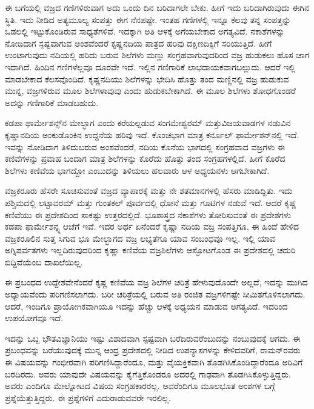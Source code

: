 \newpage

ಈ ಬಗೆಯಲ್ಲಿ ವಜ್ರದ ಗಣಿಗಳಿರುವಾಗ ಅದು ಒಂದು ದಿನ ಬರಿದಾಗಲೇ ಬೇಕು. ಹೀಗೆ ಇದು ಬರಿದಾಗಿರುವುದು ಈಗಿನ ಸ್ಥಿತಿ. ಇದು ನೀಡಿದ ಅತ್ಯಮೂಲ್ಯ ಸಂಪತ್ತು ಈಗ ನೆನಪಷ್ಟೇ. ಇಂತಹ ಗಣಿಗಳಲ್ಲಿ ಇನ್ನೂ ಕೆಲವು ತನ್ನ ಸಂಪತ್ತನ್ನು ಒಡಲಲ್ಲಿ ಇಟ್ಟುಕೊಂಡಿರುವ ಸಾಧ್ಯತೆಗಳಿವೆ. ಇದಕ್ಕಾಗಿ ಅತಿ ಆಳಕ್ಕೆ ಅಗೆಯಬೇಕಾದ ಅಗತ್ಯವಿದೆ. ನಕಾಶೆಗಳನ್ನು ನೋಡಿದಾಗ ಸ್ಪಷ್ಟವಾಗುವ ಅಂಶವೆಂದರೆ ಕೃಷ್ಣನದಿಯ ಪಾತ್ರದ ಹರಿವು ದಕ್ಷಿಣದಿಕ್ಕಿಗೆ ಸರಿಯುತ್ತಿದೆ. ಹೀಗೆ ಉಂಟಾಗುವುದು ನದಿಯಲ್ಲಿ ಹರಿದು ಬರುವ ಶಿಲೆಗಳು ಮಣ್ಣು ಸಂಗ್ರಹವಾಗುವುದರಿಂದ ವಜ್ರ ಹುಡುಕಲು ಹೊಸ ಜಾಗ ಇದಾಗಿದೆ. ಹಿಂದಿನ ಗಣಿಗಳೆಲ್ಲವೂ ದೂರವೇ ಇದೆ. ಇಲ್ಲಿನ ಗಣಿಗಾರಿಕೆ ಲಾಭದಾಯಕವಾಗಬಲ್ಲುದು. ಆದರೆ ಇಲ್ಲಿ ಮಾಡಬೇಕಾದ ಕೆಲಸವೊಂದಿದೆ. ಕೃಷ್ಣನದಿಯು ಶಿಲೆಗಳನ್ನು ಭೇದಿಸಿ ಹೊತ್ತು ತಂದ ಮಣ್ಣಿನಲ್ಲಿ ವಜ್ರ ಹುಡುಕುವ ಮುನ್ನ, ವಜ್ರಗಳಿರುವ ಮೂಲ ಶಿಲೆಗಳಾವುವು ಎಂದು ಹುಡುಕಬೇಕಾಗಿದೆ. ಈ ಮೂಲ ಶಿಲೆಗಳು ಶೋಧಗೊಂಡರೆ ಅದನ್ನು ಗಣಿಗಾರಿಕೆ ಮಾಡಬಹುದು. 

ಕಡಪಾ ಫಾರ್ಮೇಶನ್ಸ್‌ನ ಮೇಲ್ಭಾಗ ಎಂದು ಕರೆಯಲ್ಪಡುವ ಸಂಗಮೇಶ್ವರಮ್ ಮತ್ತು\break ವಿಜಯವಾಡಗಳ ನಡುವಿನ ಕೃಷ್ಣಾನದಿಯ ಅಂಕುಡೊಂಕಿನ ಉದ್ದನೆಯ ಹರಿವು ಇದೆ. ಕೊಂಚಭಾಗ ಮಾತ್ರ ಕರ್ನೂಲ್ ಫಾರ್ಮೇಶನ್‌ನಲ್ಲಿ ಇದೆ. ಇವನ್ನು ನೋಡಿದಾಗ ತಿಳಿದುಬರುವ ಅಂಶವೆಂದರೆ, ನದಿಯ ಕೊನೆಯ ಭಾಗದಲ್ಲಿ ಸಂಗ್ರಹವಾದ ವಜ್ರಗಳು ಈ ಕಣಿವೆಗಳನ್ನು ಪ್ರವಾಹ ಬಂದಾಗ ಮಾತ್ರ ಶಿಲೆಗಳನ್ನು ಕೊರೆದು ಹೊತ್ತು ತಂದ ಸಂಗ್ರಹಗಳಲ್ಲಿದೆ. ಹೀಗೆ ಕೊರೆದ ಶಿಲೆಗಳು ಕಣಿವೆಯ ಭಾಗದ್ದೋ ಎಂಬುದನ್ನು ತಿಳಿಯಲು ಹಲವಾರು ಆಳ ಅಧ್ಯಯನಳು ಆಗಬೇಕಾಗಿದೆ.

ವಜ್ರಕರೂರು ಹೆಸರೇ ಸೂಚಿಸುವಂತೆ ವಜ್ರದ ವ್ಯಾಪಾರಕ್ಕೆ  ಮತ್ತು  ನೇ ಶತಮಾನಗಳಲ್ಲಿ ಹೆಸರು ಮಾಡಿದ್ದಿತು. ಇದು ಪಶ್ಚಿಮದಲ್ಲಿ ಲಟ್ಟಾವರಮ್ ಮತ್ತು ಗುಂತಕಲ್ ಪೂರ್ವದಲ್ಲಿ ಧೋನೆ ಮತ್ತು ಗೂಟಿಗಳ ನಡುವೆ ಇದೆ. ಆದರೆ ಕೃಷ್ಣ ಕಣಿವೆಯು ಈ ಪ್ರದೇಶದಿಂದ ಸಾಕಷ್ಟು ಉತ್ತರದಲ್ಲಿದೆ. ಭೂಶಾಸ್ತ್ರದ ನಕಾಶೆಗಳು ತೋರಿಸುವಂತೆ ಈ ಪ್ರದೇಶಗಳು ಕಡಪಾ ಫಾರ್ಮೇಶನ್ಸ್ನ ಆಚೆಗೆ ಇವೆ. ಇದರ ಅರ್ಥ ಏನೆಂದರೆ ಕೃಷ್ಣಾ ನದಿಯ ವಜ್ರ ಸಂಪತ್ತಿಗೂ, ಈ ಹಿಂದೆ ಹೇಳಿದ ವಜ್ರಕರೂಲಿನ ಸುತ್ತ ಸಿಗುವ ಭೂ ಮೇಲ್ಭಾಗದ ವಜ್ರ ಲಭ್ಯತೆಗೂ ಯಾವ ಸಂಬಂಧವೂ ಇಲ್ಲ. ಇಲ್ಲಿ ಯಾವ ಅಗ್ನಿಪರ್ವತಗಳು ಇಲ್ಲದಿರುವುದರಿಂದ ಕೃಷ್ಣಾ ಕಣಿವೆಯ ವಜ್ರಶಿಲೆಗಳು ಆಸ್ಫೋಟಗೊಂಡ ಈ ಪ್ರದೇಶದಲ್ಲಿ ಚದುರಿ ಬಿದ್ದಿವೆಯೆಂಬ ದಾಖಲೆಯಿಲ್ಲ.

ಈ ಪ್ರಬಂಧದ ಉದ್ದೇಶವೇನೆಂದರೆ ಕೃಷ್ಣ ಕಣಿವೆಯ ವಜ್ರ ಶಿಲೆಗಳ ಚರಿತ್ರೆ ಹೇಳುವುದೊಂದೇ ಅಲ್ಲದೆ, ಇದನ್ನು ಮುಗಿದ ಅಧ್ಯಾಯವೆಂದು ಪರಿಗಣಿಸಲಾಗದು. ಬರೀ ಚರಿತ್ರೆಯಲ್ಲಿ ಬರುವ ಅತಿ ರಂಜಿತ ವಜ್ರಗಳಿಗಷ್ಟೇ ಸೀಮಿತಗೊಳಿಸಲಾಗದು. ಆದರೆ, ಇಂದಿಗೂ ಪ್ರಾಯೋಗಿಕವಾಗಿಯೂ ಇದನ್ನು ಹೆಚ್ಚು ಆಳಕ್ಕೆ ಅಧ್ಯಯನ ಮಾಡುವ ಅಗತ್ಯವಿದೆ. ಇದರಿಂದ ಉಪಯೋಗವೂ ಇದೆ.

ಇದನ್ನು ಒಬ್ಬ ಭೌತವಿಜ್ಞಾನಿಯು ಇಷ್ಟು ವಿಶಾದವಾಗಿ ಸ್ಪಷ್ಟವಾಗಿ ಬರೆದಿರುವರೆಂಬುದನ್ನು ನಂಬುವುದಕ್ಕೆ ಆಗದು. ಈ ಪ್ರಬಂಧವನ್ನು ಬರೆಯುವುದಕ್ಕೆ ಮುನ್ನ ಆಂಧ್ರ ಪ್ರದೇಶದಲ್ಲಿ ನೀಡಿದ ಉಪನ್ಯಾಸಗಳನ್ನು ಕೇಳಿದವರಿಗೆ, ರಾಮನ್‌ರವರು ಈ ವಿಷಯವನ್ನು ಗಂಭೀರವಾಗಿ ಪರಿಗಣಿಸಿದ್ದಾರೆಂದೂ, ಮತ್ತು ವೈಯಕ್ತಿಕವಾಗಿ ತೊಡಗಿಸಿಕೊಂಡಿದ್ದಾರೆಂದೂ ಅರಿವಿಗೆ ಬರದಿರದು. ಅವರು ಯಾವುದೇ ವಿಷಯವನ್ನು ಕೈಗೆತ್ತಿಕೊಂಡರೂ ಅದರಲ್ಲಿ ಗಾಢವಾಗಿ ತೊಡಗಿಸಿಕೊಳ್ಳುತ್ತಿದ್ದರು. ಅವರು ಎಂದಿಗೂ ಮೇಲ್ನೋಟದ ವಿಷಯ ಸಂಗ್ರಹಕಾರರಲ್ಲ. ಅವರೆಂದಿಗೂ ಮೂಲಭೂತ ಅಂಶಗಳ ಬಗ್ಗೆ ಪ್ರಶ್ನೆಯೆತ್ತುತ್ತಿದ್ದರು. ಈ ಪ್ರಶ್ನೆಗಳಿಗೆ ಎದುರಾಡುವವರೇ ಇರಲಿಲ್ಲ.

